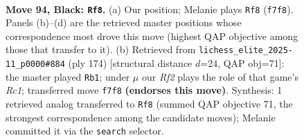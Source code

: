 \documentclass[11pt]{article}
\begin{document}
\begin{figure}[p]\centering
\begin{subfigure}{0.46\textwidth}\centering
\resizebox{\linewidth}{!}{%
\newchessgame
\chessboard[
  setfen={8/5r2/p2k4/P1p2p1p/1pR2P1P/4P1P1/1P4K1/8 b - - 0 94},
  showmover=false,
  pgfstyle=straightmove, color=movearrow, markmove={f7-f8}
]}
\caption{}
\end{subfigure}\hfill
\begin{subfigure}{0.46\textwidth}\centering
\resizebox{\linewidth}{!}{%
\newchessgame
\chessboard[
  setfen={8/1p6/p1p2kp1/P6p/1P2rP1P/4P3/4K3/2R5 w - - 11 88},
  showmover=false,
  pgfstyle=straightmove, color=movearrow, markmove={c1-b1}
]}
\caption{}
\end{subfigure}
\\[4pt]

\caption{\textbf{Move 94, Black: \texttt{Rf8}.} (a) Our position; Melanie plays \texttt{Rf8} (\texttt{f7f8}). Panels (b)--(d) are the retrieved master positions whose correspondence most drove this move (highest QAP objective among those that transfer to it). (b) Retrieved from \texttt{lichess\_elite\_2025-11\_p0000\#884} (ply 174) [structural distance $d$=24, QAP obj=71]: the master played \texttt{Rb1}; under $\mu$ our \emph{Rf2} plays the role of that game's \emph{Rc1}; transferred move \texttt{f7f8} \textbf{(endorses this move)}. Synthesis: 1 retrieved analog transferred to \texttt{Rf8} (summed QAP objective 71, the strongest correspondence among the candidate moves); Melanie committed it via the \texttt{search} selector.}
\label{fig:thought-m187}
\end{figure}

\clearpage
\end{document}
